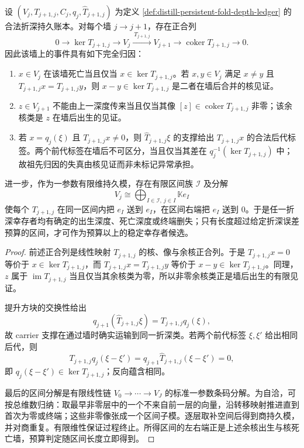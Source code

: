 \begin{theorem}[折深持久账本的墙映射归因]\label{thm:distill-persistent-fold-depth-ledger-attribution}
设 \((V_j,T_{j+1,j},C_j,q_j,\widehat T_{j+1,j})\) 为定义 \ref{def:distill-persistent-fold-depth-ledger} 的合法折深持久账本。对每个墙 \(j\to j+1\)，存在正合列
\[
0\longrightarrow \ker T_{j+1,j}\longrightarrow V_j
\xrightarrow{\ T_{j+1,j}\ } V_{j+1}
\longrightarrow \operatorname{coker}T_{j+1,j}\longrightarrow 0 .
\]
因此该墙上的事件具有如下完全归因：
\begin{enumerate}
  \item \(x\in V_j\) 在该墙死亡当且仅当 \(x\in\ker T_{j+1,j}\)。若 \(x,y\in V_j\) 满足 \(x\ne y\) 且 \(T_{j+1,j}x=T_{j+1,j}y\)，则 \(x-y\in\ker T_{j+1,j}\) 是二者在墙后合并的核见证。
  \item \(z\in V_{j+1}\) 不能由上一深度传来当且仅当其像 \([z]\in\operatorname{coker}T_{j+1,j}\) 非零；该余核类是 \(z\) 在墙后出生的见证。
  \item 若 \(x=q_j(\xi)\) 且 \(T_{j+1,j}x\ne0\)，则 \(\widehat T_{j+1,j}\xi\) 的支撑给出 \(T_{j+1,j}x\) 的合法后代标签。两个前代标签在墙后不可区分，当且仅当其差在 \(q_j^{-1}(\ker T_{j+1,j})\) 中；故祖先归因的失真由核见证而非未标记异常承担。
\end{enumerate}
进一步，作为一参数有限维持久模，存在有限区间族 \(\mathcal I\) 及分解
\[
V_j\cong\bigoplus_{I\in\mathcal I,\ j\in I}\mathbb K e_I
\]
使每个 \(T_{j+1,j}\) 在同一区间内把 \(e_I\) 送到 \(e_I\)，在区间右端把 \(e_I\) 送到 \(0\)。于是任一折深幸存者均有确定的出生深度、死亡深度或终端删失；只有长度超过给定折深误差预算的区间，才可作为预算以上的稳定幸存者候选。
\end{theorem}
\begin{proof}
前述正合列是线性映射 \(T_{j+1,j}\) 的核、像与余核正合列。于是 \(T_{j+1,j}x=0\) 等价于 \(x\in\ker T_{j+1,j}\)，而 \(T_{j+1,j}x=T_{j+1,j}y\) 等价于 \(x-y\in\ker T_{j+1,j}\)。同理，\(z\) 属于 \(\operatorname{im}T_{j+1,j}\) 当且仅当其余核类为零，所以非零余核类正是墙后出生的有限见证。

提升方块的交换性给出
\[
q_{j+1}(\widehat T_{j+1,j}\xi)=T_{j+1,j}q_j(\xi),
\]
故 carrier 支撑在通过墙时确实运输到同一折深类。若两个前代标签 \(\xi,\xi'\) 给出相同后代，则
\[
T_{j+1,j}q_j(\xi-\xi')=q_{j+1}\widehat T_{j+1,j}(\xi-\xi')=0,
\]
即 \(q_j(\xi-\xi')\in\ker T_{j+1,j}\)；反向蕴含相同。

最后的区间分解是有限线性链 \(V_0\to\cdots\to V_J\) 的标准一参数条码分解。为自洽，可按总维数归纳：取最早非零层中的一个不来自前一层的向量，沿转移映射推进直到首次为零或终端；这些非零像张成一个区间子模。逐层取补空间后得到商持久模，并对商重复。有限维性保证过程终止。所得区间的左右端正是上述余核出生与核死亡墙，预算判定随区间长度立即得到。
\end{proof}

